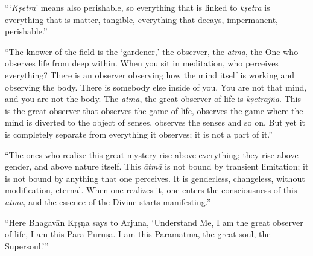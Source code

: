\enquote{\enquote{\textit{Kṣetra}} means also perishable, so everything that is linked to \textit{kṣetra} is everything that is matter, tangible, everything that decays, impermanent, perishable.}

\enquote{The knower of the field is the \enquote{gardener,} the observer, the \textit{ātmā}, the One who observes life from deep within. When you sit in meditation, who perceives everything? There is an observer observing how the mind itself is working and observing the body. There is somebody else inside of you. You are not that mind, and you are not the body. The \textit{ātmā}, the great observer of life is \textit{kṣetrajña}. This is the great observer that observes the game of life, observes the game where the mind is diverted to the object of senses, observes the senses and so on. But yet it is completely separate from everything it observes; it is not a part of it.}

\enquote{The ones who realize this great mystery rise above everything; they rise above gender, and above nature itself. This \textit{ātmā} is not bound by transient limitation; it is not bound by anything that one perceives. It is genderless, changeless, without modification, eternal. When one realizes it, one enters the consciousness of this \textit{ātmā}, and the essence of the Divine starts manifesting.}

\enquote{Here Bhagavān Kṛṣṇa says to Arjuna, \enquote{Understand Me, I am the great observer of life, I am this Para-Puruṣa. I am this Paramātmā, the great soul, the Supersoul.}}


